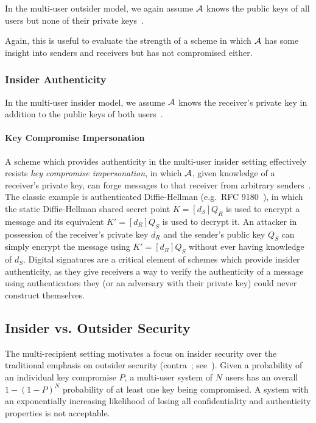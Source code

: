 In the multi-user outsider model, we again assume $\mathcal{A}$ knows the public keys of all users but none of their
private keys~\cite[p. 47]{baek2010}.

Again, this is useful to evaluate the strength of a scheme in which $\mathcal{A}$ has some insight into senders and
receivers but has not compromised either.

\subsubsection{Insider Authenticity}\label{subsubsec:sec-auth-insider}

In the multi-user insider model, we assume $\mathcal{A}$ knows the receiver's private key in addition to the public keys
of both users~\cite[p. 48]{baek2010}.

\paragraph{Key Compromise Impersonation}

A scheme which provides authenticity in the multi-user insider setting effectively resists
\emph{key compromise impersonation}, in which $\mathcal{A}$, given knowledge of a receiver's private key, can
forge messages to that receiver from arbitrary senders~\cite{strangio2006}.
The classic example is authenticated Diffie-Hellman (e.g.\ RFC 9180~\cite{rfc9180, alwen2021}), in which the static
Diffie-Hellman shared secret point $K=[d_S]Q_R$ is used to encrypt a message and its equivalent $K'=[d_R]Q_S$ is used
to decrypt it.
An attacker in possession of the receiver's private key $d_R$ and the sender's public key $Q_S$ can simply encrypt the
message using $K'=[d_R]Q_S$ without ever having knowledge of $d_S$.
Digital signatures are a critical element of schemes which provide insider authenticity, as they give receivers a way to
verify the authenticity of a message using authenticators they (or an adversary with their private key) could never
construct themselves.

\subsection{Insider vs. Outsider Security}\label{subsec:security-insider-vs-outsider}

The multi-recipient setting motivates a focus on insider security over the traditional emphasis on outsider security
(contra~\cite[p. 26]{an2010}\cite[p. 46]{baek2010}; see~\cite{badertscher2018}).
Given a probability of an individual key compromise $P$, a multi-user system of $N$ users has an overall $1-(1-P)^N$
probability of at least one key being compromised.
A system with an exponentially increasing likelihood of losing all confidentiality and authenticity properties is not
acceptable.


